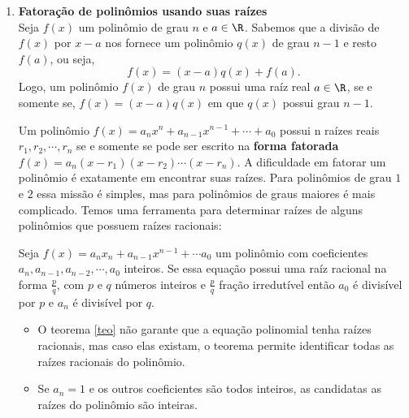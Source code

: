 \begin{enumerate}
\item \textbf{Fatoração de polinômios usando suas raízes} \\
Seja $f(x)$ um polinômio de grau $n$ e $a\in\R$. Sabemos que a divisão de $f(x)$ por $x-a$ nos fornece um polinômio $q(x)$ de grau $n-1$ e resto $f(a)$, ou seja,
\[f(x)=(x-a)q(x)+f(a).\]
Logo, um polinômio $f(x)$ de grau $n$ possui uma raíz real $a\in\R$, se e somente se, $f(x)=(x-a)q(x)$ em que $q(x)$ possui grau $n-1$.

Um polinômio $f(x)=a_nx^n+a_{n-1}x^{n-1}+\cdots+a_0$ possui n raízes reais $r_1,r_2,\cdots,r_n$ se e somente se pode ser escrito na \textbf{forma fatorada} $f(x)=a_n(x-r_1)(x-r_2)\cdots(x-r_n).$ A dificuldade em fatorar um polinômio é exatamente em encontrar suas raízes. Para polinômios de grau $1$ e $2$ essa missão é simples, mas para polinômios de graus maiores é mais complicado. Temos uma ferramenta para determinar raízes de alguns polinômios que possuem raízes racionais:

\begin{teo} \label{teo}Seja $f(x)=a_nx_n+a_{n-1}x^{n-1}+\cdots a_0$ um polinômio com coeficientes \\
$a_n,a_{n-1}, a_{n-2},\cdots,a_0$ inteiros.
Se essa equação possui uma raíz racional na forma $\frac{p}{q}$, com $p$ e $q$ números inteiros e $\frac{p}{q}$ fração irredutível então $a_0$ é divisível por $p$ e $a_n$ é divisível por $q$.
\end{teo}

\begin{obs}
\begin{itemize}
\item[1.] O teorema \ref{teo} não garante que a equação polinomial tenha raízes racionais, mas caso elas existam, o teorema permite identificar todas as raízes racionais do polinômio.
\item[2.] Se $a_n = 1$ e os outros coeficientes são todos inteiros, as candidatas as raízes do polinômio são inteiras.
\end{itemize} %
\end{obs}


\end{enumerate}

